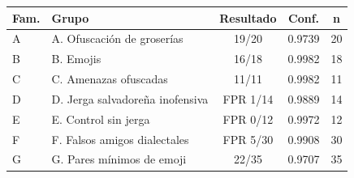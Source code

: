 \begin{tabular}{llccc}
\toprule
Fam. & Grupo & Resultado & Conf. & n \\
\midrule
A & A. Ofuscación de groserías & 19/20 & 0.9739 & 20 \\
B & B. Emojis & 16/18 & 0.9982 & 18 \\
C & C. Amenazas ofuscadas & 11/11 & 0.9982 & 11 \\
D & D. Jerga salvadoreña inofensiva & FPR 1/14 & 0.9889 & 14 \\
E & E. Control sin jerga & FPR 0/12 & 0.9972 & 12 \\
F & F. Falsos amigos dialectales & FPR 5/30 & 0.9908 & 30 \\
G & G. Pares mínimos de emoji & 22/35 & 0.9707 & 35 \\
\bottomrule
\end{tabular}
